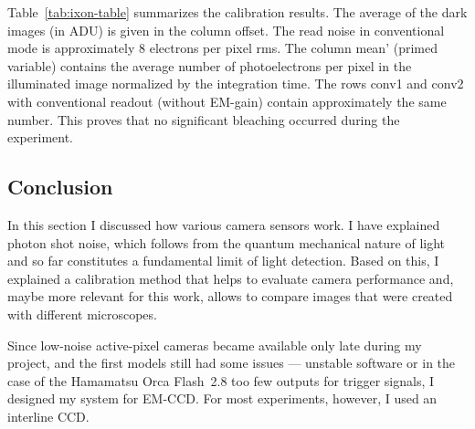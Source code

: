 


Table~\ref{tab:ixon-table} summarizes the calibration results. The
average of the dark images (in ADU) is given in the column
\textsf{offset}. The read noise in conventional mode is approximately
8 electrons per pixel rms. The column \textsf{mean'} (primed variable)
contains the average number of photoelectrons per pixel in the
illuminated image normalized by the integration time. The rows
\textsf{conv1} and \textsf{conv2} with conventional readout (without
EM-gain) contain approximately the same number. This proves that no
significant bleaching occurred during the experiment.

\subsection{Conclusion}

In this section I discussed how various camera sensors work. I have
explained photon shot noise, which follows from the quantum mechanical
nature of light and so far constitutes a fundamental limit of light
detection. Based on this, I explained a calibration method that helps
to evaluate camera performance and, maybe more relevant for this work,
allows to compare images that were created with different microscopes.

Since low-noise active-pixel cameras became available only late during
my project, and the first models still had some issues --- unstable
software or in the case of the Hamamatsu Orca Flash~2.8 too few
outputs for trigger signals, I designed my system for EM-CCD.  For
most experiments, however, I used an interline CCD.



